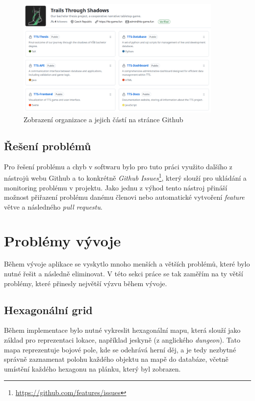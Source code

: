 \begin{figure}[H]
    \centering
    \includegraphics[width=0.9\textwidth]{../../shared/figures/gitOrg}
    \caption{Zobrazení organizace a jejich částí na stránce Github}
    \label{fig:git_organization}
\end{figure}

\subsection{Řešení problémů}
\label{subsec:implementation-collaboration-problems}
Pro řešení problému a chyb v softwaru bylo pro tuto práci využito dalšího z nástrojů webu Github a to konkrétně \textit{Github Issues}\footnote{\href{https://github.com/features/issues}{https://github.com/features/issues}}, který slouží pro ukládání a monitoring problému v projektu. Jako jednu z výhod tento nástroj přináší možnost přiřazení problému danému členovi nebo automatické vytvoření \textit{feature} větve a následného \textit{pull requestu}.

\section{Problémy vývoje}
\label{sec:implementation-problems}
Během vývoje aplikace se vyskytlo mnoho menších a větších problémů, které bylo nutné řešit a následně eliminovat. V této sekci práce se tak zaměřím na ty větší problémy, které přinesly největší výzvu během vývoje.

\subsection*{Hexagonální grid}
\label{subsec:implementation-problems-hexagon}
Během implementace bylo nutné vykreslit hexagonální mapu, která slouží jako základ pro reprezentaci lokace, například jeskyně (z anglického \textit{dungeon}). Tato mapa reprezentuje bojové pole, kde se odehrává herní děj, a je tedy nezbytné správně zaznamenat polohu každého objektu na mapě do databáze, včetně umístění každého hexagonu na plánku, který byl zobrazen.

